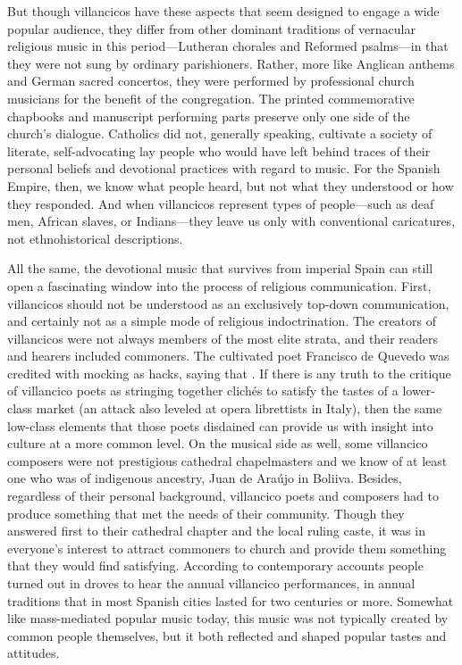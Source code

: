 But though villancicos have these aspects that seem designed to engage a wide
popular audience, they differ from other dominant traditions of vernacular
religious music in this period---Lutheran chorales and Reformed psalms---in
that they were not sung by ordinary parishioners.
Rather, more like Anglican anthems and German sacred concertos, they were
performed by professional church musicians for the benefit of the congregation.
The printed commemorative chapbooks and manuscript performing parts preserve
only one side of the church's dialogue.
Catholics did not, generally speaking, cultivate a society of literate,
self-advocating lay people who would have left behind traces of their personal
beliefs and devotional practices with regard to music.
For the Spanish Empire, then, we know what people heard, but not what they
understood or how they responded.%
    \Autocite{Burstyn:PeriodEar} %
And when villancicos represent types of people---such as deaf men, African
slaves, or Indians---they leave us only with conventional caricatures, not
ethnohistorical descriptions.%
    \Autocites
    {Baker:EthnicVC}
    {Baker:PerformancePostColonial}
    {Davies:LocalContent}

All the same, the devotional music that survives from imperial Spain
can still open a fascinating window into the process of religious communication.
First, villancicos should not be understood as an exclusively top-down
communication, and certainly not as a simple mode of religious indoctrination.
The creators of villancicos were not always members of the most elite strata,
and their readers and hearers included commoners.
The cultivated poet Francisco de Quevedo was credited with mocking  as hacks, saying that .%
    \Autocite[37]{Torres:SuenosMorales}
If there is any truth to the critique of villancico poets as stringing together
clichés to satisfy the tastes of a lower-class market (an attack also leveled at
opera librettists in Italy), then the same low-class elements that those poets
disdained can provide us with insight into culture at a more common level.
On the musical side as well, some villancico composers were not prestigious
cathedral chapelmasters and we know of at least one who was of indigenous
ancestry, Juan de Araújo in Boliiva.%
    \Autocite{Illari:Popular}
Besides, regardless of their personal background, villancico poets and composers
had to produce something that met the needs of their community. 
Though they answered first to their cathedral chapter and the local ruling
caste, it was in everyone's interest to attract commoners to church and provide
them something that they would find satisfying.
According to contemporary accounts people turned out in droves to hear the
annual villancico performances, in annual traditions that in most Spanish
cities lasted for two centuries or more.%
Somewhat like mass-mediated popular music today, this music was not typically
created by common people themselves, but it both reflected and shaped popular
tastes and attitudes.


